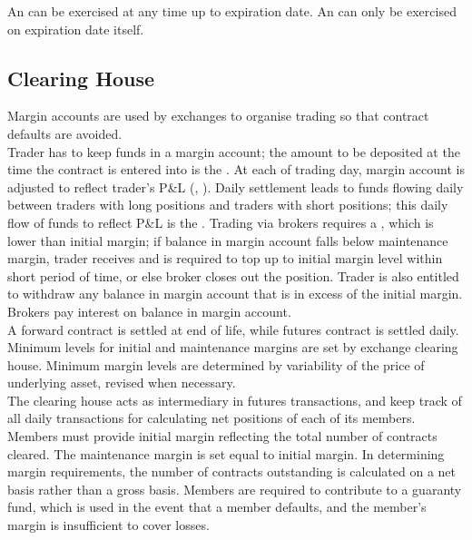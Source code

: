\begin{definition} An  can be exercised at any time up to expiration date. An  can only be exercised on expiration date itself.
\end{definition}

\subsection{Clearing House}

Margin accounts are used by exchanges to organise trading so that contract defaults are avoided. \\
Trader has to keep funds in a margin account; the amount to be deposited at the time the contract is entered into is the . At each of trading day, margin account is adjusted to reflect trader's P\&L (, ). Daily settlement leads to funds flowing daily between traders with long positions and traders with short positions; this daily flow of funds to reflect P\&L is the . Trading via brokers requires a , which is lower than initial margin; if balance in margin account falls below maintenance margin, trader receives  and is required to top up to initial margin level within short period of time, or else broker closes out the position. Trader is also entitled to withdraw any balance in margin account that is in excess of the initial margin. Brokers pay interest on balance in margin account.\\
A forward contract is settled at end of life, while futures contract is settled daily. Minimum levels for initial and maintenance margins are set by exchange clearing house. Minimum margin levels are determined by variability of the price of underlying asset, revised when necessary.\\

The clearing house acts as intermediary in futures transactions, and keep track of all daily transactions for calculating net positions of each of its members. Members must provide initial margin reflecting the total number of contracts cleared. The maintenance margin is set equal to initial margin. In determining margin requirements, the number of contracts outstanding is calculated on a net basis rather than a gross basis. Members are required to contribute to a guaranty fund, which is used in the event that a member defaults, and the member's margin is insufficient to cover losses.

